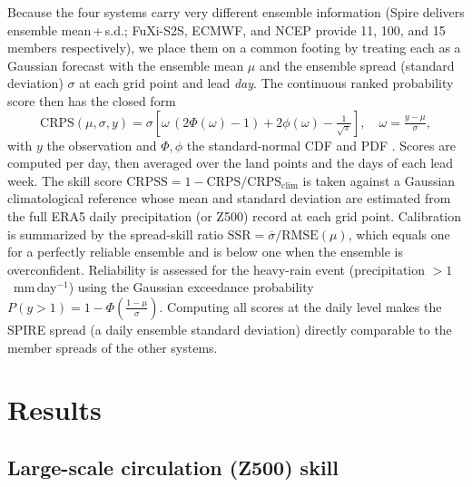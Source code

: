 \documentclass[11pt,a4paper]{article}
\begin{document}
Because the four systems carry very different ensemble information
(Spire delivers ensemble mean\,+\,s.d.; FuXi-S2S, ECMWF, and NCEP
provide 11, 100, and 15 members respectively), we place them on a common
footing by treating each as a Gaussian forecast with the ensemble mean
$\mu$ and the ensemble spread (standard deviation) $\sigma$ at each grid
point and lead
\emph{day}. The continuous ranked probability score then has the
closed form
\begin{equation}
  \mathrm{CRPS}(\mu,\sigma,y) = \sigma\!\left[\omega\,(2\Phi(\omega)-1)
  + 2\phi(\omega) - \tfrac{1}{\sqrt{\pi}}\right],\quad \omega=\tfrac{y-\mu}{\sigma},
  \label{eq:crps}
\end{equation}
with $y$ the observation and $\Phi,\phi$ the standard-normal CDF and PDF
\citep{gneiting2007}. Scores are computed per day, then averaged over the
land points and the days of each lead week. The skill score
$\mathrm{CRPSS}=1-\mathrm{CRPS}/\mathrm{CRPS}_{\mathrm{clim}}$ is taken
against a Gaussian climatological reference whose mean and standard
deviation are estimated from the full ERA5 daily precipitation (or Z500)
record at each grid point. Calibration is summarized by the spread-skill
ratio $\mathrm{SSR}=\overline{\sigma}/\mathrm{RMSE}(\mu)$, which equals
one for a perfectly reliable ensemble and is below one when the ensemble
is overconfident. Reliability is assessed for the heavy-rain event
(precipitation $>1$~mm\,day$^{-1}$) using the Gaussian exceedance
probability $P(y>1)=1-\Phi\!\left(\tfrac{1-\mu}{\sigma}\right)$.
Computing all scores at the daily level makes the SPIRE spread (a daily
ensemble standard deviation) directly comparable to the member spreads of
the other systems.

\section{Results}\label{sec:results}

\subsection{Large-scale circulation (Z500) skill}\label{sec:lead_skill}
\end{document}
